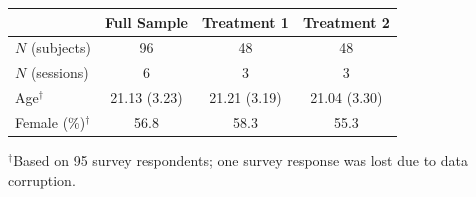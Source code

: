 \begingroup
\centering
\small
\begin{tabular}{lccc}
\toprule
 & Full Sample & Treatment 1 & Treatment 2 \\
\midrule
  $N$ (subjects) & 96 & 48 & 48 \\
  $N$ (sessions) & 6 & 3 & 3 \\
  Age$^\dagger$ & 21.13 (3.23) & 21.21 (3.19) & 21.04 (3.30) \\
  Female (\%)$^\dagger$ & 56.8 & 58.3 & 55.3 \\
\bottomrule
\end{tabular}
\par
\vspace{2pt}
{\footnotesize $^\dagger$Based on 95 survey respondents; one survey response was lost due to data corruption.}
\endgroup
